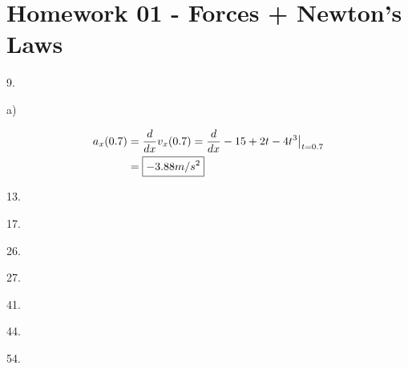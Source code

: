 \documentclass{scrreprt} %
\begin{document}
\section{Homework 01 - Forces + Newton's Laws}

9.

a)

\begin{align*}
	a_x(0.7) &= \frac{d}{dx}v_x(0.7) = \evalat{\frac{d}{dx}-15 + 2t - 4t^3}{t=0.7} \\
			 &= \boxed{-3.88 m/s^2}
\end{align*}




13.

17.

26.

27.

41.

44.

54.
\end{document}
